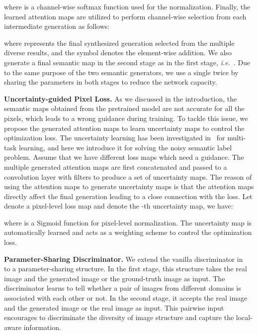 \documentclass[10pt,twocolumn,letterpaper]{article}
\def\ie{\textit{i.e.}~}
\begin{document}
where  is a channel-wise softmax function used for the normalization. Finally, the learned attention maps are utilized to perform channel-wise selection from each intermediate generation as follows:
\vspace{-0.1cm}

where  represents the final synthesized generation selected from the multiple diverse results, and the symbol  denotes the element-wise addition.
We also generate a final semantic map in the second stage as in the first stage, \ie . Due to the same purpose of the two semantic generators, we use a single  twice by sharing the parameters in both stages to reduce the network capacity.

\noindent \textbf{Uncertainty-guided Pixel Loss.}
As we discussed in the introduction, the semantic maps obtained from the pretrained model are not accurate for all the pixels, which leads to a wrong guidance during training. To tackle this issue, we propose the generated attention maps to learn uncertainty maps to control the optimization loss. The uncertainty learning has been investigated in~\cite{kendall2017multi} for multi-task learning, and here we introduce it for solving the noisy semantic label problem. 
Assume that we have  different loss maps which need a guidance. The multiple generated attention maps are first concatenated and passed to a convolution layer with  filters  to produce a set of  uncertainty maps. The reason of using the attention maps to generate uncertainty maps is that the attention maps directly affect the final generation leading to a close connection with the loss. Let  denote a pixel-level loss map and  denote the -th uncertainty map, we have:
\vspace{-0.1cm}

where  is a Sigmoid function for pixel-level normalization. The uncertainty map is automatically learned and acts as a weighting scheme to control the optimization loss.

\noindent \textbf{Parameter-Sharing Discriminator.}
We extend the vanilla discriminator in~\cite{isola2017image} to a parameter-sharing structure. 
In the first stage, this structure takes the real image  and the generated image  or the ground-truth image  as input. The discriminator  learns to tell whether a pair of images from different domains is associated with each other or not. In the second stage, it accepts the real image  and the generated image  or the real image  as input. This pairwise input encourages  to discriminate the diversity of image structure and capture the local-aware information. 
\end{document}
